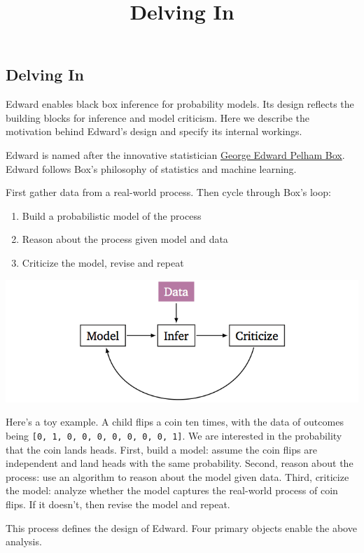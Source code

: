 \title{Delving In}

\subsection{Delving In}

Edward enables black box inference for probability models. Its design reflects
the building blocks for inference and model criticism. Here we describe the
motivation behind Edward's design and specify its internal workings.

Edward is named after the innovative statistician
\href{https://en.wikipedia.org/wiki/George_E._P._Box}{George Edward
Pelham Box}. Edward follows Box's philosophy of statistics and machine
learning.

First gather data from a real-world process. Then cycle through Box's
loop:

\begin{enumerate}
\item Build a probabilistic model of the process
\item Reason about the process given model and data
\item Criticize the model, revise and repeat
\end{enumerate}

\includegraphics{images/model_infer_criticize.png}

Here's a toy example. A child flips a coin ten times, with the data of
outcomes being \texttt{{[}0,\ 1,\ 0,\ 0,\ 0,\ 0,\ 0,\ 0,\ 0,\ 1{]}}. We
are interested in the probability that the coin lands heads. First,
build a model: assume the coin flips are independent and land heads with
the same probability. Second, reason about the process: use an algorithm
to reason about the model given data. Third, criticize the model: analyze
whether the model captures the real-world process of coin flips. If it
doesn't, then revise the model and repeat.

This process defines the design of Edward. Four primary objects enable the
above analysis. 

